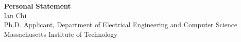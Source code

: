 \documentclass[11pt]{article}
\begin{document}
\begin{center}
    {\Large \textbf{Personal Statement}}\\[4pt]
    {\large Ian Chi}\\[2pt]
    Ph.D. Applicant, Department of Electrical Engineering and Computer Science\\
    Massachusetts Institute of Technology
\end{center}

\vspace{1em}

\end{document}
